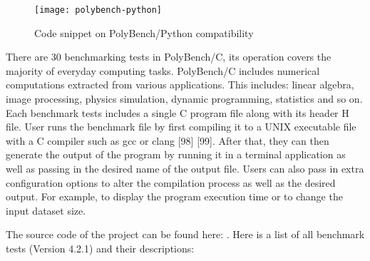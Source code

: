 \bigskip
\begin{figure}[hp]
\centering
\texttt{[image: polybench-python]}
\caption{\footnotesize{Code snippet on PolyBench/Python compatibility}}
\captionsetup{aboveskip=0pt,font=it}
\end{figure}
\bigskip

There are 30 benchmarking tests in PolyBench/C, its operation covers the majority of everyday computing tasks. PolyBench/C includes numerical computations extracted from various applications. This includes: linear algebra, image processing, physics simulation, dynamic programming, statistics and so on. Each benchmark tests includes a single C program file along with its header H file. User runs the benchmark file by first compiling it to a UNIX executable file with a C compiler such as gcc or clang [98] [99]. After that, they can then generate the output of the program by running it in a terminal application as well as passing in the desired name of the output file. Users can also pass in extra configuration options to alter the compilation process as well as the desired output. For example, to display the program execution time or to change the input dataset size.

The source code of the project can be found here: \href{https://web.cse.ohio-state.edu/~pouchet.2/software/polybench/}{\color{blue}{The Polyhedral Benchmark Suite}}. Here is a list of all benchmark tests (Version 4.2.1) and their descriptions:

